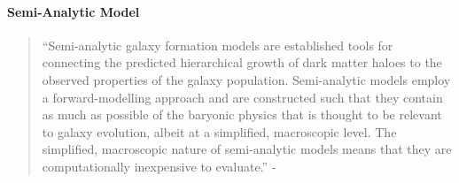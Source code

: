 \documentclass[letterpaper,10pt,english]{sphinxmanual}
\begin{document}
\paragraph{Semi-Analytic Model}
\label{\detokenize{resource/astro/topics/galaxy_formation_model:semi-analytic-model}}\begin{quote}

“Semi-analytic galaxy formation models are established tools for
connecting the predicted hierarchical growth of dark matter haloes to
the observed properties of the galaxy population. Semi-analytic
models employ a forward-modelling approach and are constructed such
that they contain as much as possible of the baryonic physics that is
thought to be relevant to galaxy evolution, albeit at a simplified,
macroscopic level. The simplified, macroscopic nature of
semi-analytic models means that they are computationally inexpensive
to evaluate.” - 
\end{quote}
\end{document}
